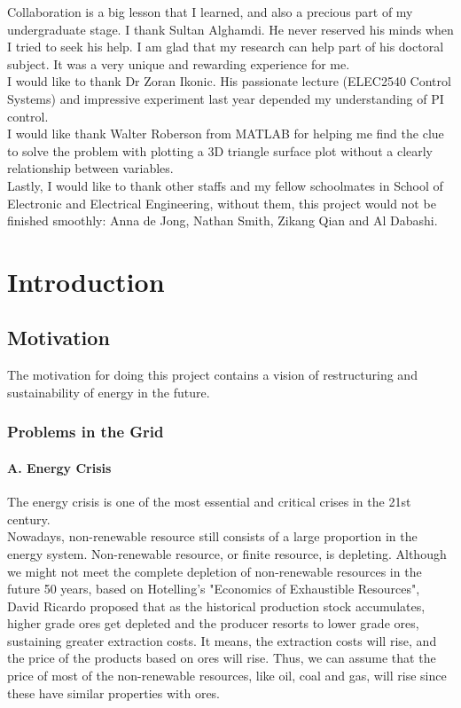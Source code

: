 \documentclass{report}
\begin{document}
Collaboration is a big lesson that I learned, and also a precious part of my undergraduate stage. I thank Sultan Alghamdi. He never reserved his minds when I tried to seek his help. I am glad that my research can help part of his doctoral subject. It was a very unique and rewarding experience for me.\\

I would like to thank Dr Zoran Ikonic. His passionate lecture (ELEC2540 Control Systems) and impressive experiment last year depended my understanding of PI control.\\

I would like thank Walter Roberson from MATLAB for helping me find the clue to solve the problem with plotting a 3D triangle surface plot without a clearly relationship between variables.\\

Lastly, I would like to thank other staffs and my fellow schoolmates in School of Electronic and Electrical Engineering, without them, this project would not be finished smoothly: Anna de Jong, Nathan Smith, Zikang Qian and Al Dabashi.\\



\afterpreface


\chapter{Introduction}
\section{Motivation} %
The motivation for doing this project contains a vision of restructuring and sustainability of energy in the future.
\subsection{Problems in the Grid}
\subsubsection{A. Energy Crisis}
The energy crisis is one of the most essential and critical crises in the 21st century.\\

Nowadays, non-renewable resource still consists of a large proportion in the energy system. Non-renewable resource, or finite resource, is depleting. Although we might not meet the complete depletion of non-renewable resources in the future 50 years, based on Hotelling’s "Economics of Exhaustible Resources", David Ricardo proposed that as the historical production stock accumulates, higher grade ores get depleted and the producer resorts to lower grade ores, sustaining greater extraction costs. It means, the extraction costs will rise, and the price of the products based on ores will rise. Thus, we can assume that the price of most of the non-renewable resources, like oil, coal and gas, will rise since these have similar properties with ores.\\
\end{document}
